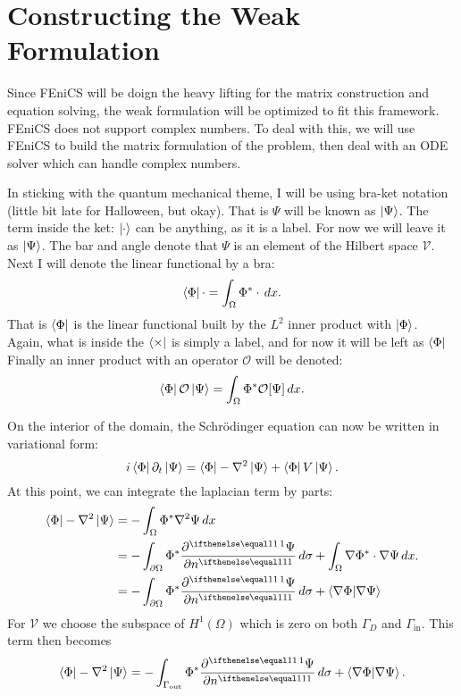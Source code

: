 \documentclass[../../main.tex]{subfiles}
\begin{document}
\section{Constructing the Weak Formulation}

Since FEniCS will be doign the heavy lifting for the matrix construction
and equation solving, the weak formulation will be optimized to fit 
this framework.  
FEniCS does not support complex numbers.  
To deal with this, we will use FEniCS to build the matrix formulation 
of the problem, then deal with an ODE solver which can handle complex
numbers. 

In sticking with the quantum mechanical theme, 
I will be using bra-ket notation (little bit late for Halloween, but okay).
That is 
$\Psi$ will be known as $\ket{\Psi}$.  
The term inside the ket: $\ket{\cdot}$ can be anything,
as it is a label.  For now we will leave it as $\ket{\Psi}$.
The bar and angle denote that $\Psi$ is an element of the 
Hilbert space $\mathcal V$. 
Next I will denote the linear functional by a bra:
\[
		\bra{\Phi} \cdot = \int_\Omega \Phi^* \cdot \, dx
.\]
That is $\bra{\Phi}$ is the linear functional 
built by the $L^2$ inner product with $\ket{\Phi}$.
Again, what is inside the $\bra{\times}$ is simply a label,
and for now it will be left as $\bra{\Phi}$
Finally an inner product with an operator $\mathcal O$ will be denoted:
\[
		\bra{\Phi} \mathcal O \ket{\Psi} = 
		\int_\Omega \Phi^* \mathcal O[\Psi] \, dx
.\] 

On the interior of the domain, the Schr\"odinger equation can now
be written in variational form:
\[
		  i \bra{\Phi} \partial_t \ket{\Psi} 
		   =  \bra{\Phi} -\nabla^2 \ket{\Psi} + 
		  \bra{\Phi} V \ket{\Psi}
.\]
At this point, we can integrate the laplacian term by parts:
\[
  \begin{split}
		  \bra{\Phi} -\nabla^2 \ket{\Psi} 
		  & = -\int_\Omega \Phi^* \nabla^2 \Psi \, dx \\
		  & = -\int_{\partial \Omega} \Phi^* \pder{\Psi}{n} \, d\sigma + 
				  \int_\Omega \nabla \Phi^* \cdot \nabla \Psi \, dx \\
		  & = -\int_{\partial \Omega} \Phi^* \pder{\Psi}{n} \, d\sigma + 
		  \bra{\nabla \Phi} \ket{\nabla \Psi}
  \end{split}
.\] 
For $\mathcal V$ we choose the subspace of $H^1(\Omega)$ which is 
zero on both $\Gamma_D$ and $\Gamma_\mathrm{in}$.  
This term then becomes
\[
		\bra{\Phi} -\nabla^2 \ket{\Psi} = 
		-\int_{\Gamma_\mathrm{out}} \Phi^* \pder{\Psi}{n} \, d\sigma 
		+ \bra{\nabla \Phi} \ket{\nabla \Psi}
.\] 
\end{document}
